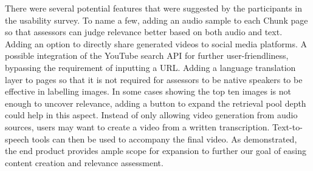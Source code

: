 \documentclass{l4proj}
\begin{document}
There were several potential features that were suggested by the participants in the usability survey. To name a few, adding an audio sample to each Chunk page so that assessors can judge relevance better based on both audio and text. Adding an option to directly share generated videos to social media platforms. A possible integration of the YouTube search API for further user-friendliness, bypassing the requirement of inputting a URL. Adding a language translation layer to pages so that it is not required for assessors to be native speakers to be effective in labelling images. In some cases showing the top ten images is not enough to uncover relevance, adding a button to expand the retrieval pool depth could help in this aspect. Instead of only allowing video generation from audio sources, users may want to create a video from a written transcription. Text-to-speech tools can then be used to accompany the final video. As demonstrated, the end product provides ample scope for expansion to further our goal of easing content creation and relevance assessment.



\end{document}
